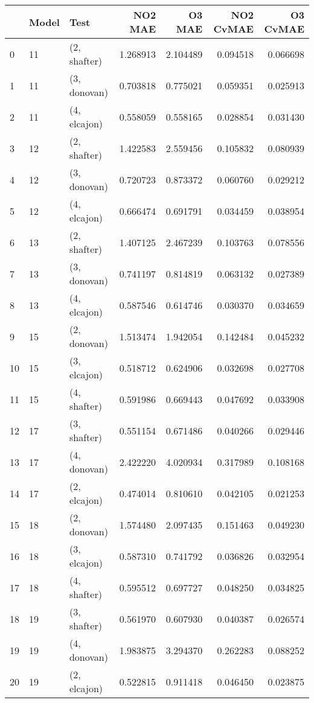 \begin{tabular}{lllrrrr}
\toprule
{} & Model &          Test &   NO2 MAE &    O3 MAE &  NO2 CvMAE &  O3 CvMAE \\
\midrule
0  &    11 &  (2, shafter) &  1.268913 &  2.104489 &   0.094518 &  0.066698 \\
1  &    11 &  (3, donovan) &  0.703818 &  0.775021 &   0.059351 &  0.025913 \\
2  &    11 &  (4, elcajon) &  0.558059 &  0.558165 &   0.028854 &  0.031430 \\
3  &    12 &  (2, shafter) &  1.422583 &  2.559456 &   0.105832 &  0.080939 \\
4  &    12 &  (3, donovan) &  0.720723 &  0.873372 &   0.060760 &  0.029212 \\
5  &    12 &  (4, elcajon) &  0.666474 &  0.691791 &   0.034459 &  0.038954 \\
6  &    13 &  (2, shafter) &  1.407125 &  2.467239 &   0.103763 &  0.078556 \\
7  &    13 &  (3, donovan) &  0.741197 &  0.814819 &   0.063132 &  0.027389 \\
8  &    13 &  (4, elcajon) &  0.587546 &  0.614746 &   0.030370 &  0.034659 \\
9  &    15 &  (2, donovan) &  1.513474 &  1.942054 &   0.142484 &  0.045232 \\
10 &    15 &  (3, elcajon) &  0.518712 &  0.624906 &   0.032698 &  0.027708 \\
11 &    15 &  (4, shafter) &  0.591986 &  0.669443 &   0.047692 &  0.033908 \\
12 &    17 &  (3, shafter) &  0.551154 &  0.671486 &   0.040266 &  0.029446 \\
13 &    17 &  (4, donovan) &  2.422220 &  4.020934 &   0.317989 &  0.108168 \\
14 &    17 &  (2, elcajon) &  0.474014 &  0.810610 &   0.042105 &  0.021253 \\
15 &    18 &  (2, donovan) &  1.574480 &  2.097435 &   0.151463 &  0.049230 \\
16 &    18 &  (3, elcajon) &  0.587310 &  0.741792 &   0.036826 &  0.032954 \\
17 &    18 &  (4, shafter) &  0.595512 &  0.697727 &   0.048250 &  0.034825 \\
18 &    19 &  (3, shafter) &  0.561970 &  0.607930 &   0.040387 &  0.026574 \\
19 &    19 &  (4, donovan) &  1.983875 &  3.294370 &   0.262283 &  0.088252 \\
20 &    19 &  (2, elcajon) &  0.522815 &  0.911418 &   0.046450 &  0.023875 \\

\end{tabular}
